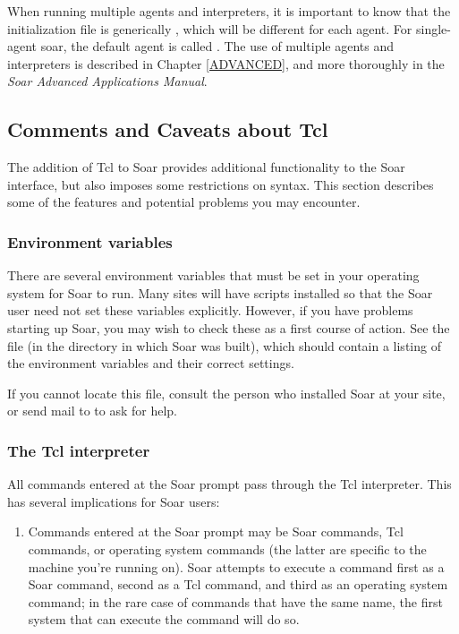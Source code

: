 {When running multiple agents and interpreters, it is important to know that
the  initialization file is generically
, which will be different for each agent. For
single-agent soar, the default agent is called . The use of
multiple agents and interpreters is described in Chapter \ref{ADVANCED}, and
more thoroughly in the \textit{Soar Advanced Applications Manual}.


\subsection{Comments and Caveats about Tcl}
\label{INTERFACE-tcl}

The addition of Tcl to Soar provides additional functionality to the Soar
interface, but also imposes some restrictions on syntax. This section
describes some of the features and potential problems you may encounter.


\subsubsection*{Environment variables}

There are several environment variables that must be set in your operating
system for Soar to run. Many sites will have scripts installed so that the
Soar user need not set these variables explicitly. However, if you have
problems starting up Soar, you may wish to check these as a first course of
action. See the file  (in the directory in
which Soar was built), which should contain a listing of the environment
variables and their correct settings.


If you cannot locate this file, consult the person who installed Soar at your
site, or send mail to  to ask for help.

\subsubsection*{The Tcl interpreter}

All commands entered at the Soar prompt pass through the Tcl interpreter. This
has several implications for Soar users:\vspace{-12pt}
\begin{enumerate}
\item Commands entered at the Soar prompt may be Soar commands, Tcl commands,
	or operating system commands (the latter are specific to the machine
	you're running on). Soar attempts to execute a command first as a Soar
	command, second as a Tcl command, and third as an operating system
	command; in the rare case of commands that have the same name, the
	first system that can execute the command will do so.\vspace{-6pt}


\end{enumerate}}
